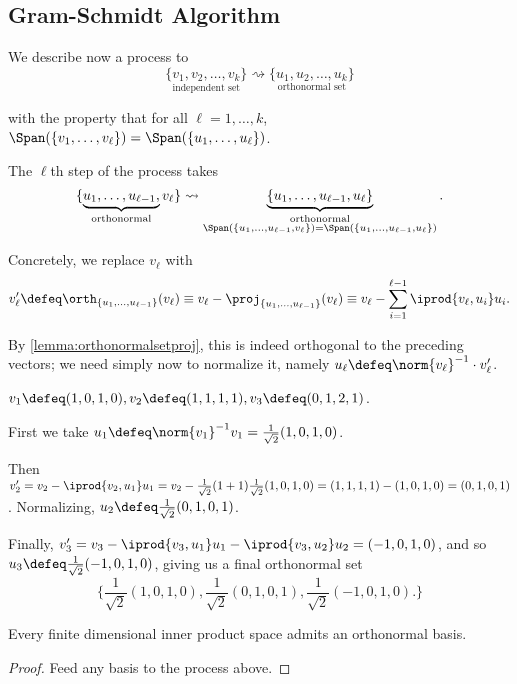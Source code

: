 \subsection{Gram-Schmidt Algorithm}
We describe now a process to
\[
\underset{\text{independent set}}{\{v_1, v_2, \dots, v_k\}} \rightsquigarrow \underset{\text{orthonormal set}}{\{u_1, u_2, \dots, u_k\}}
\]

with the property that for all $\ell = 1, \dots, k$, $\Span( \{v_1, \dots, v_\ell\}) = \Span (\{u_1, \dots, u_\ell\})$.

The $\ell$th step of the process takes 
\[
    \{\underbrace{u_1, \dots, u_{\ell-1},}_{\text{orthonormal}} v_\ell\}    \rightsquigarrow \underbrace{\{u_1, \dots, u_{\ell-1}, u_\ell\}}_{\substack{\text{orthonormal}\\ \Span(\{u_1, \dots, u_{\ell-1}, v_\ell\}) = \Span(\{u_1, \dots, u_{\ell-1}, u_\ell\})}}.
\]

Concretely, we replace $v_\ell$ with $$v_\ell' \defeq \orth_{\{u_1, \dots, u_{\ell-1}\}}(v_\ell) \equiv v_\ell - \proj_{\{u_1, \dots, u_{\ell - 1}\}}(v_{\ell}) \equiv v_{\ell} - \sum_{i=1}^{\ell - 1} \iprod{v_\ell, u_i} u_i.$$

By \cref{lemma:orthonormalsetproj}, this is indeed orthogonal to the preceding vectors; we need simply now to normalize it, namely $u_\ell \defeq \norm{v_\ell}^{-1} \cdot v_\ell'$.

\begin{example}
    $v_1 \defeq (1, 0, 1, 0), v_2 \defeq (1, 1, 1, 1), v_3 \defeq (0, 1, 2, 1)$.

    First we take $u_1 \defeq \norm{v_1}^{-1}v_1 = \frac{1}{\sqrt{2}}(1, 0, 1, 0)$.
    
    Then $v_2' = v_2 - \iprod{v_2, u_1} u_1 = v_2 - \frac{1}{\sqrt{2}}(1+1)\frac{1}{\sqrt{2}}(1,0,1,0) = (1,1,1,1) - (1,0,1,0) = (0,1,0,1)$. Normalizing, $u_2 \defeq \frac{1}{\sqrt{2}}(0,1,0,1)$.

    Finally, $v_3' = v_3 - \iprod{v_3, u_1}u_1 - \iprod{v_3, u_2}u_2 = (-1, 0, 1, 0)$, and so $u_3 \defeq \frac{1}{\sqrt{2}}(-1, 0, 1, 0)$, giving us a final orthonormal set \[
    \{
    \frac{1}{\sqrt{2}}(1,0,1,0), \frac{1}{\sqrt{2}}(0,1,0,1), \frac{1}{\sqrt{2}}(-1,0,1,0).
    \}    
    \]
\end{example}

\begin{corollary}\label{cor:finiteorthonormalbasis}
    Every finite dimensional inner product space admits an orthonormal basis.
\end{corollary}

\begin{proof}
    Feed any basis to the process above.
\end{proof}